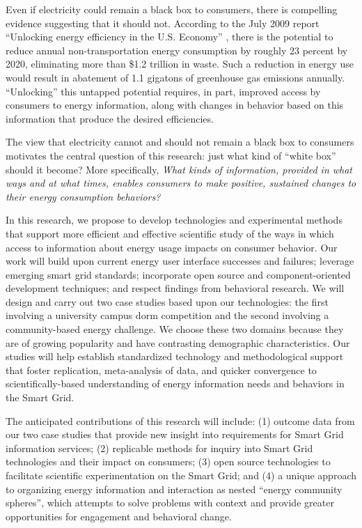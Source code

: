 Even if electricity could remain a black box to consumers, there is
compelling evidence suggesting that it should not.  According to the July
2009 report ``Unlocking energy efficiency in the U.S. Economy''
\cite{Granade09}, there is the potential to reduce annual
non-transportation energy consumption by roughly 23 percent by 2020,
eliminating more than \$1.2 trillion in waste.  Such a reduction in energy
use would result in abatement of 1.1 gigatons of greenhouse gas emissions
annually. ``Unlocking'' this untapped potential requires, in part, improved
access by consumers to energy information, along with changes in behavior
based on this information that produce the desired efficiencies.

The view that electricity cannot and should not remain a black box to
consumers motivates the central question of this research: just what kind of
``white box'' should it become?  More specifically, {\em What kinds of
  information, provided in what ways and at what times, enables consumers
  to make positive, sustained changes to their energy consumption
  behaviors?}

In this research, we propose to develop technologies and experimental
methods that support more efficient and effective scientific study of the
ways in which access to information about energy usage impacts on consumer
behavior.  Our work will build upon current energy user interface successes
and failures; leverage emerging smart grid standards; incorporate open
source and component-oriented development techniques; and respect findings
from behavioral research. We will design and carry out two case studies
based upon our technologies: the first involving a university campus dorm
competition and the second involving a community-based energy challenge. We
choose these two domains because they are of growing popularity and have
contrasting demographic characteristics.  Our studies will help establish
standardized technology and methodological support that foster replication,
meta-analysis of data, and quicker convergence to scientifically-based
understanding of energy information needs and behaviors in the Smart Grid.

The anticipated contributions of this research will include: (1) outcome
data from our two case studies that provide new insight into requirements
for Smart Grid information services; (2) replicable methods for inquiry
into Smart Grid technologies and their impact on consumers; (3) open
source technologies to facilitate scientific experimentation on the Smart
Grid; and (4) a unique approach to organizing energy information and
interaction as nested ``energy community spheres'', which attempts to solve
problems with context and provide greater opportunities for engagement and
behavioral change.

